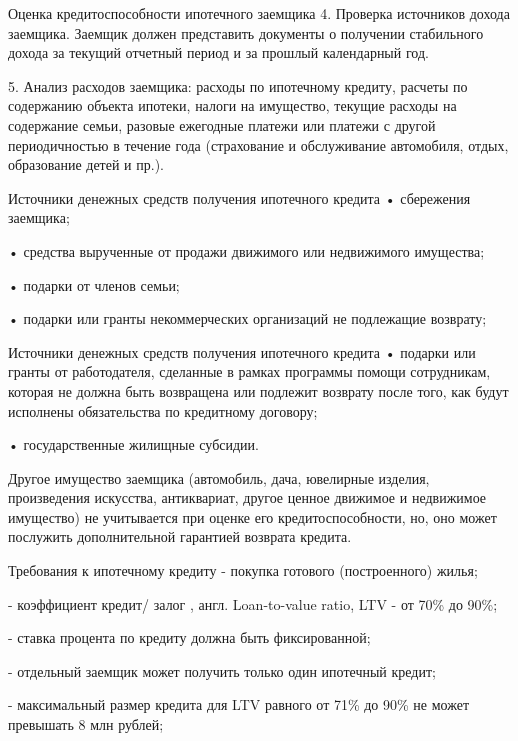 \documentclass[_Banking_p2.tex]{subfiles}
\begin{document}
\begin{frame}{Оценка кредитоспособности ипотечного заемщика}
4. Проверка источников дохода заемщика. Заемщик должен представить документы о получении стабильного дохода за текущий отчетный период и за прошлый календарный год.

5. Анализ расходов заемщика: расходы по ипотечному кредиту, расчеты по содержанию объекта ипотеки, налоги на имущество, текущие расходы на содержание семьи, разовые ежегодные платежи или платежи с другой периодичностью в течение года (страхование и обслуживание автомобиля, отдых, образование детей и пр.).
\end{frame}
\begin{frame}{Источники денежных средств получения ипотечного кредита}
•	сбережения заемщика;

•	средства вырученные от продажи движимого или недвижимого имущества;

•	подарки от членов семьи;

•	подарки или гранты некоммерческих организаций не подлежащие возврату;
\end{frame}

\begin{frame}{Источники денежных средств получения ипотечного кредита}
•	подарки или гранты от работодателя, сделанные в рамках программы помощи сотрудникам, которая не должна быть возвращена или подлежит возврату после того, как будут исполнены обязательства по кредитному договору;

•	государственные жилищные субсидии.

Другое имущество заемщика (автомобиль, дача, ювелирные изделия, произведения искусства, антиквариат, другое ценное движимое и недвижимое имущество) не учитывается при оценке его кредитоспособности, но, оно может послужить дополнительной гарантией возврата кредита.
\end{frame}

\begin{frame}{Требования к ипотечному кредиту}
- покупка готового (построенного) жилья;

- коэффициент кредит/ залог , англ. Loan-to-value ratio, LTV  - от 70\% до 90\%;

- ставка процента по кредиту должна быть фиксированной;

- отдельный заемщик может получить только один ипотечный кредит;

- максимальный размер кредита для LTV равного от 71\% до 90\% не может превышать 8 млн рублей;
\end{frame}
\end{document}
